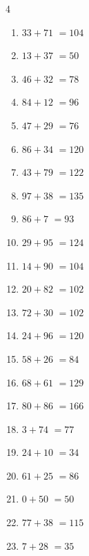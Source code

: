 \begin{multicols}{4}
\begin{enumerate}
  \item $33+71$
        $=104$

  \item $13+37$
        $=50$

  \item $46+32$
        $=78$

  \item $84+12$
        $=96$

  \item $47+29$
        $=76$

  \item $86+34$
        $=120$

  \item $43+79$
        $=122$

  \item $97+38$
        $=135$

  \item $86+7$
        $=93$

  \item $29+95$
        $=124$

  \item $14+90$
        $=104$

  \item $20+82$
        $=102$

  \item $72+30$
        $=102$

  \item $24+96$
        $=120$

\columnbreak %

  \item $58+26$
        $=84$

  \item $68+61$
        $=129$

  \item $80+86$
        $=166$

  \item $3+74$
        $=77$

  \item $24+10$
        $=34$

  \item $61+25$
        $=86$

  \item $0+50$
        $=50$

  \item $77+38$
        $=115$

  \item $7+28$
        $=35$


\end{enumerate}
\end{multicols}

